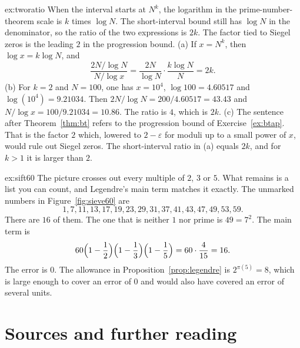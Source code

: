\begin{solution}{ex:tworatio}
\idea When the interval starts at $N^k$, the logarithm in the prime-number-theorem scale is $k$ times $\log N$. The short-interval bound still has $\log N$ in the denominator, so the ratio of the two expressions is $2k$. The factor tied to Siegel zeros is the leading $2$ in the progression bound.
\writeup (a) If $x=N^k$, then $\log x=k\log N$, and
\[
\frac{2N/\log N}{N/\log x}=\frac{2N}{\log N}\cdot\frac{k\log N}N=2k.
\]
(b) For $k=2$ and $N=100$, one has $x=10^4$, $\log100=4.60517$ and $\log(10^4)=9.21034$. Then $2N/\log N=200/4.60517=43.43$ and $N/\log x=100/9.21034=10.86$. The ratio is $4$, which is $2k$.
(c) The sentence after Theorem~\ref{thm:bt} refers to the progression bound of Exercise~\ref{ex:btap}. That is the factor $2$ which, lowered to $2-\varepsilon$ for moduli up to a small power of $x$, would rule out Siegel zeros. The short-interval ratio in (a) equals $2k$, and for $k>1$ it is larger than $2$.
\end{solution}

\begin{solution}{ex:sift60}
\idea The picture crosses out every multiple of $2$, $3$ or $5$. What remains is a list you can count, and Legendre's main term matches it exactly.
\writeup The unmarked numbers in Figure~\ref{fig:sieve60} are
\[
1,7,11,13,17,19,23,29,31,37,41,43,47,49,53,59.
\]
There are $16$ of them. The one that is neither $1$ nor prime is $49=7^2$. The main term is
\[
60\Bigl(1-\frac12\Bigr)\Bigl(1-\frac13\Bigr)\Bigl(1-\frac15\Bigr)=60\cdot\frac4{15}=16.
\]
The error is $0$. The allowance in Proposition~\ref{prop:legendre} is $2^{\pi(5)}=8$, which is large enough to cover an error of $0$ and would also have covered an error of several units.
\end{solution}

\section*{Sources and further reading}

